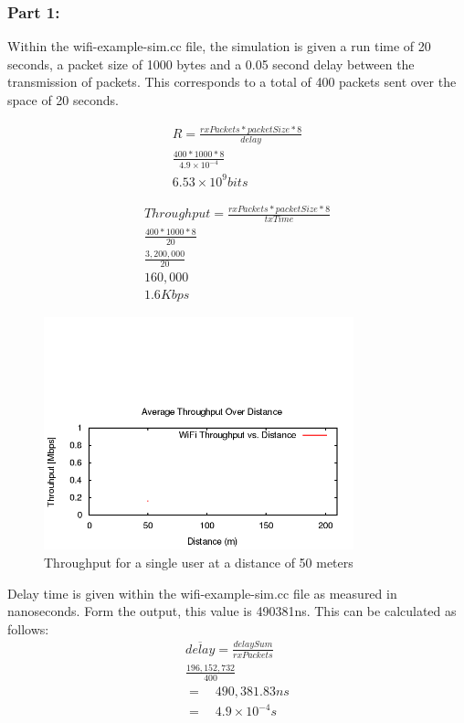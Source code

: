\subsubsection{Part 1:}

Within the wifi-example-sim.cc file, the simulation is given a run time of 20
seconds, a packet size of 1000 bytes and a 0.05 second delay between the
transmission of packets. This corresponds to a total of 400 packets sent over
the space of 20 seconds.

\begin{gather*}
	R=\frac{rxPackets*packetSize*8}{delay} \\
	\frac{400*1000*8}{4.9\times10^{-4}} \\
	6.53\times10^{9}bits
\end{gather*}

\begin{gather*}
	Throughput=\frac{rxPackets*packetSize*8}{txTime} \\
	\frac{400*1000*8}{20} \\
	\frac{3,200,000}{20} \\
	160,000 \\
	1.6Kbps
\end{gather*}

\begin{figure}[H]
	\centering
	\includegraphics[width=0.8\textwidth]{images/EE500/QA/P1/Images/wifi-throughput}
	\caption{Throughput for a single user at a distance of 50 meters}
	\label{fig:QAthroughput}
\end{figure}

\par Delay time is given within the wifi-example-sim.cc file as measured in
nanoseconds. Form the output, this value is 490381ns. This can be calculated as
follows:
\begin{gather*}
	\overline{delay}=\frac{delaySum}{rxPackets} \\
	\frac{196,152,732}{400} \\
	= \quad 490,381.83ns \\
	= \quad 4.9\times10^{-4}s
\end{gather*}

